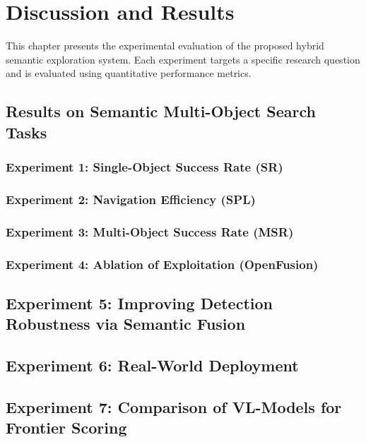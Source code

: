 \chapter{Discussion and Results}
This chapter presents the experimental evaluation of the proposed hybrid semantic exploration system. Each experiment targets a specific research question and is evaluated using quantitative performance metrics.

\section{Results on Semantic Multi-Object Search Tasks}

\subsection{Experiment 1: Single-Object Success Rate (SR)}

\subsection{Experiment 2: Navigation Efficiency (SPL)}

\subsection{Experiment 3: Multi-Object Success Rate (MSR)}

\subsection{Experiment 4: Ablation of Exploitation (OpenFusion)}

\section{Experiment 5: Improving Detection Robustness via Semantic Fusion}

\section{Experiment 6: Real-World Deployment}

\section{Experiment 7: Comparison of VL-Models for Frontier Scoring}
